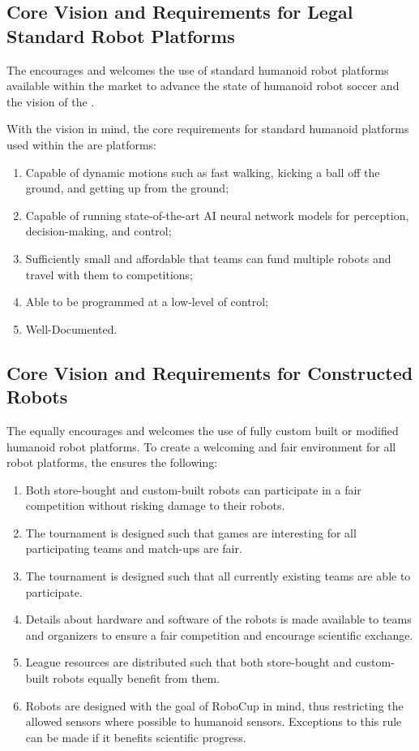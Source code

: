 \subsection{Core Vision and Requirements for Legal Standard Robot Platforms}

The \leaguenameabbr encourages and welcomes the use of standard humanoid robot platforms available within the market to advance the state of humanoid robot soccer and the vision of the \leaguenameabbr.

With the \leaguenameabbr vision in mind, the core requirements for standard humanoid platforms used within the \leaguenameabbr are platforms:
\begin{enumerate}
    \item Capable of dynamic motions such as fast walking, kicking a ball off the ground, and getting up from the ground;
    \item Capable of running state-of-the-art AI neural network models for perception, decision-making, and control;
    \item Sufficiently small and affordable that teams can fund multiple robots and travel with them to competitions;
    \item Able to be programmed at a low-level of control;
    \item Well-Documented.
\end{enumerate}

\subsection{Core Vision and Requirements for Constructed Robots}

The \leaguenameabbr equally encourages and welcomes the use of fully custom built or modified humanoid robot platforms. To create a welcoming and fair environment for all robot platforms, the \leaguenameabbr ensures the following:
\begin{enumerate}
	\item Both store-bought and custom-built robots can participate in a fair competition without risking damage to their robots.
	\item The tournament is designed such that games are interesting for all participating teams and match-ups are fair.
	\item The tournament is designed such that all currently existing teams are able to participate.
	\item Details about hardware and software of the robots is made available to teams and organizers to ensure a fair competition and encourage scientific exchange.
	\item League resources are distributed such that both store-bought and custom-built robots equally benefit from them.
	\item Robots are designed with the goal of RoboCup in mind, thus restricting the allowed sensors where possible to humanoid sensors. Exceptions to this rule can be made if it benefits scientific progress.
\end{enumerate}
